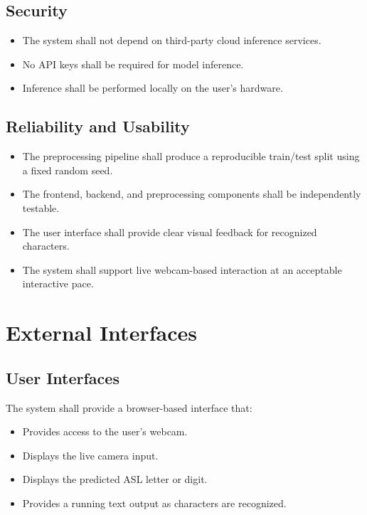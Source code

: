 \documentclass{article}
\begin{document}
\subsection{Security}
\begin{itemize}
    \item The system shall not depend on third-party cloud inference services.
    \item No API keys shall be required for model inference.
    \item Inference shall be performed locally on the user's hardware.
\end{itemize}

\subsection{Reliability and Usability}
\begin{itemize}
    \item The preprocessing pipeline shall produce a reproducible train/test split using a fixed random seed.
    \item The frontend, backend, and preprocessing components shall be independently testable.
    \item The user interface shall provide clear visual feedback for recognized characters.
    \item The system shall support live webcam-based interaction at an acceptable interactive pace.
\end{itemize}


\section{External Interfaces}

\subsection{User Interfaces}
The system shall provide a browser-based interface that:
\begin{itemize}
    \item Provides access to the user's webcam.
    \item Displays the live camera input.
    \item Displays the predicted ASL letter or digit.
    \item Provides a running text output as characters are recognized.
\end{itemize}
\end{document}
